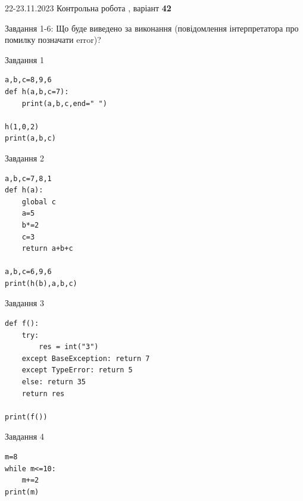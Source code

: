 \documentclass[12pt, ukrainian]{article}
\begin{document}
{{22-23.11.2023 Контрольна робота , варіант  \No \textbf { 42 }\par}}
{

Завдання 1-6: Що буде виведено за виконання (повідомлення інтерпретатора про помилку позначати error)?


\begin{minipage}[t]{9.7cm}                
{\begin{center}Завдання {1}\end{center}}
\begin{verbatim}
a,b,c=8,9,6
def h(a,b,c=7):
    print(a,b,c,end=" ")

h(1,0,2)
print(a,b,c)
\end{verbatim}     
\end{minipage}
\vline \hspace{8mm}
\begin{minipage}[t]{8.0cm}                
{\begin{center}Завдання {2}\end{center}}
\begin{verbatim}
a,b,c=7,8,1
def h(a):
    global c
    a=5
    b*=2
    c=3
    return a+b+c

a,b,c=6,9,6
print(h(b),a,b,c)
\end{verbatim}     
\end{minipage}

\vspace{15mm}
\begin{minipage}[t]{9.7cm}                
{\begin{center}Завдання {3}\end{center}}
\begin{verbatim}
def f():
    try:
        res = int("3")
    except BaseException: return 7
    except TypeError: return 5
    else: return 35
    return res

print(f())
\end{verbatim}     
\end{minipage}
\vline \hspace{8mm}
\begin{minipage}[t]{8.0cm}                
{\begin{center}Завдання {4}\end{center}}
\begin{verbatim}
m=8
while m<=10:
    m+=2
print(m)
\end{verbatim}     
\end{minipage}

}
\end{document}
